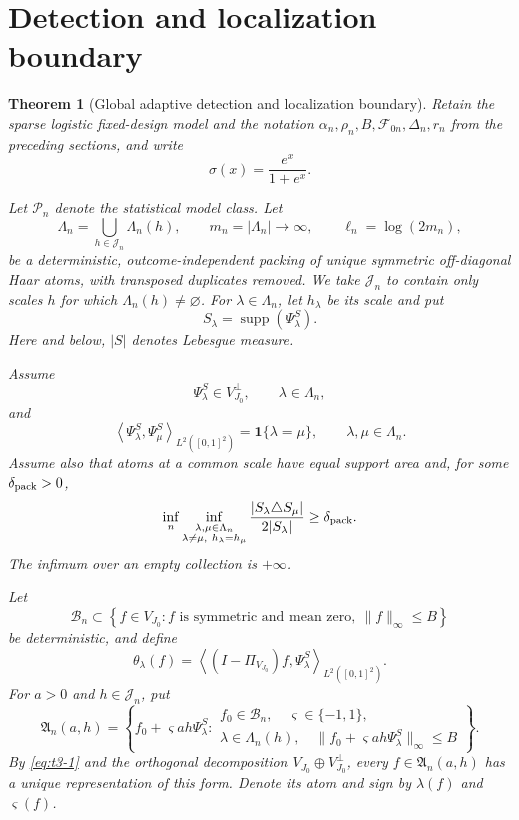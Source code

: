 \documentclass[11pt]{article}
\newtheorem{theorem}{Theorem}[section]
\theoremstyle{definition}
\newcommand{\1}{\mathbf 1}\newcommand{\op}{\operatorname}
\begin{document}
\section{Detection and localization boundary}\label{sec:supp-detect}


\begin{theorem}[Global adaptive detection and localization boundary]
\label{thm:adaptive-detection-localization}
Retain the sparse logistic fixed-design model and the notation
\(\alpha_n,\rho_n,B,\mathcal F_{0n},\Delta_n,r_n\) from the preceding
sections, and write
\[
\sigma(x)=\frac{e^x}{1+e^x}.
\]

Let $\mathscr P_n$ denote the statistical model class. Let
\[
\Lambda_n
=
\bigcup_{h\in\mathcal J_n}\Lambda_n(h),
\qquad
m_n=|\Lambda_n|\longrightarrow\infty,
\qquad
\ell_n=\log(2m_n),
\]
be a deterministic, outcome-independent packing of unique symmetric
off-diagonal Haar atoms, with transposed duplicates removed.  We take
\(\mathcal J_n\) to contain only scales \(h\) for which
\(\Lambda_n(h)\ne\varnothing\).  For
\(\lambda\in\Lambda_n\), let \(h_\lambda\) be its scale and put
\[
S_\lambda=\operatorname{supp}(\Psi_\lambda^S).
\]
Here and below, \(|S|\) denotes Lebesgue measure.

Assume
\[
\Psi_\lambda^S\in V_{J_0}^{\perp},
\qquad
\lambda\in\Lambda_n,
\]
and
\begin{equation}
\left\langle
\Psi_\lambda^S,\Psi_\mu^S
\right\rangle_{L^2([0,1]^2)}
=
\mathbf 1\{\lambda=\mu\},
\qquad
\lambda,\mu\in\Lambda_n.
\label{eq:t3-1}
\end{equation}
Assume also that atoms at a common scale have equal support area and,
for some \(\delta_{\rm pack}>0\),
\begin{equation}
\inf_n
\inf_{\substack{\lambda,\mu\in\Lambda_n\\
                 \lambda\ne\mu,\ h_\lambda=h_\mu}}
\frac{|S_\lambda\triangle S_\mu|}{2|S_\lambda|}
\ge\delta_{\rm pack}.
\label{eq:t3-2}
\end{equation}
The infimum over an empty collection is \(+\infty\).

Let
\[
\mathcal B_n
\subset
\left\{
f\in V_{J_0}:
f\text{ is symmetric and mean zero},\
\|f\|_\infty\le B
\right\}
\]
be deterministic, and define
\begin{equation}
\theta_\lambda(f)
=
\left\langle
(I-\Pi_{V_{J_0}})f,\Psi_\lambda^S
\right\rangle_{L^2([0,1]^2)}.
\label{eq:t3-3}
\end{equation}
For \(a>0\) and \(h\in\mathcal J_n\), put
\[
\mathfrak A_n(a,h)
=
\left\{
f_0+\varsigma a h\Psi_\lambda^S:
\begin{array}{l}
f_0\in\mathcal B_n,\quad
\varsigma\in\{-1,1\},\\
\lambda\in\Lambda_n(h),\quad
\|f_0+\varsigma a h\Psi_\lambda^S\|_\infty\le B
\end{array}
\right\}.
\]
By \eqref{eq:t3-1} and the orthogonal decomposition
\(V_{J_0}\oplus V_{J_0}^{\perp}\), every
\(f\in\mathfrak A_n(a,h)\) has a unique representation of this form.
Denote its atom and sign by \(\lambda(f)\) and \(\varsigma(f)\).


\end{theorem}
\end{document}
